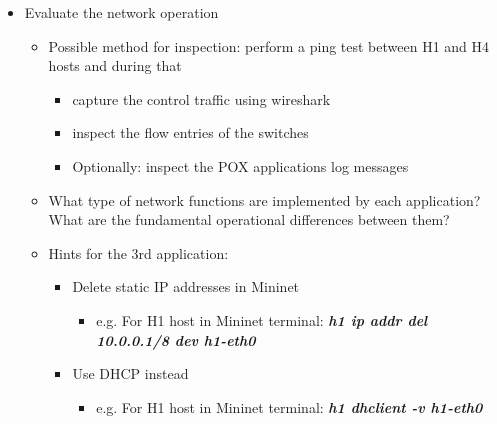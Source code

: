\documentclass[a4paper]{article}
\begin{document}
\begin{itemize}
    \item Evaluate the network operation
          \begin{itemize}
              \item Possible method for inspection: perform a ping test between H1 and H4 hosts and during that
                    \begin{itemize}
                        \item capture the control traffic using wireshark
                        \item inspect the flow entries of the switches
                        \item Optionally: inspect the POX applications log messages
                    \end{itemize}
              \item What type of network functions are implemented by each application? What are the fundamental
                    operational differences between them?
              \item Hints for the 3rd application:
                    \begin{itemize}
                        \item Delete static IP addresses in Mininet
                              \begin{itemize}
                                  \item e.g. For H1 host in Mininet terminal: \emph{\textbf{h1 ip addr del 10.0.0.1/8
                                                dev h1-eth0}}
                              \end{itemize}
                        \item Use DHCP instead
                              \begin{itemize}
                                  \item e.g. For H1 host in Mininet terminal: \emph{\textbf{h1 dhclient -v h1-eth0}}
                              \end{itemize}
                    \end{itemize}
          \end{itemize}
\end{itemize}
\end{document}
